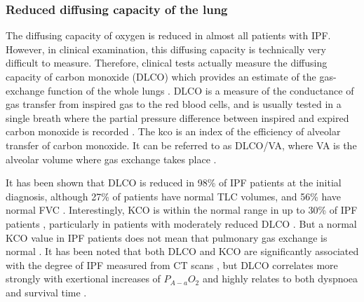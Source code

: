 \subsubsection{Reduced diffusing capacity of the lung}
The diffusing capacity of oxygen is reduced in almost all patients with IPF. However, in clinical examination, this diffusing capacity is technically very difficult to measure. Therefore, clinical tests actually measure the diffusing capacity of carbon monoxide (DLCO) which provides an estimate of the gas-exchange function of the whole lungs \citep{plantier2018physiology}. DLCO is a measure of the conductance of gas transfer from inspired gas to the red blood cells, and is usually tested in a single breath where the partial pressure difference between inspired and expired carbon monoxide is recorded \citep{rosenberg19961995,plantier2018physiology}. The \gls{kco} is an index of the efficiency of alveolar transfer of carbon monoxide. It can be referred to as DLCO/VA, where VA is the alveolar volume where gas exchange takes place \citep{graham20172017}.

It has been shown that DLCO is reduced in 98\% of IPF patients at the initial diagnosis, although 27\% of patients have normal TLC volumes, and 56\% have normal FVC \citep{cortes2014idiopathic}. Interestingly, KCO is within the normal range in up to 30\% of IPF patients \citep{wallaert2012we}, particularly in patients with moderately reduced DLCO \citep{pastre2015different}. But a normal KCO value in IPF patients does not mean that pulmonary gas exchange is normal \citep{plantier2018physiology}. It has been noted that both DLCO and KCO are significantly associated with the degree of IPF measured from CT scans \citep{wells1997lone}, but DLCO correlates more strongly with exertional increases of $P_{A-a}O_2$ \citep{agusti1994clinical} and highly relates to both dyspnoea \citep{swigris2012ucsd} and survival time \citep{hamada2007significance}.

